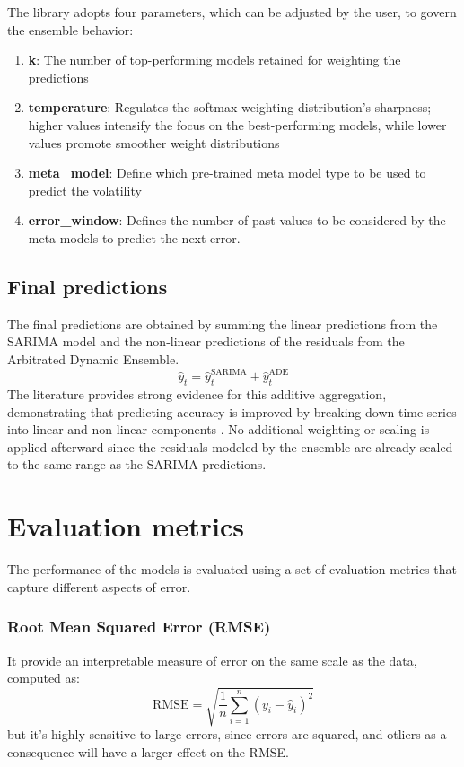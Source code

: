 The library adopts four parameters, which can be adjusted by the user, to govern the ensemble behavior:
\begin{enumerate}
    \item \textbf{k}: The number of top-performing models retained for weighting the predictions
    \item  \textbf{temperature}: Regulates the softmax weighting distribution's sharpness; higher values intensify the focus on the best-performing models, while lower values promote smoother weight distributions
    \item \textbf{meta\_model}: Define which pre-trained meta model type to be used to predict the volatility
    \item \textbf{error\_window}: Defines the number of past values to be considered by the meta-models to predict the next error.
\end{enumerate}

\subsection{Final predictions} 
The final predictions are obtained by summing the linear predictions from the SARIMA model and the non-linear predictions of the residuals from the Arbitrated Dynamic Ensemble. 
\[
\hat{y}_t = \hat{y}_t^{\text{SARIMA}} + \hat{y}_t^{\text{ADE}}
\]
The literature provides strong evidence for this additive aggregation, demonstrating that predicting accuracy is improved by breaking down time series into linear and non-linear components \cite{zhang2003hybrid}.  No additional weighting or scaling is applied afterward since the residuals modeled by the ensemble are already scaled to the same range as the SARIMA predictions. 


\section{Evaluation metrics}
The performance of the models is evaluated using a set of evaluation metrics that capture different aspects of error. 
\subsubsection{Root Mean Squared Error (RMSE)}
It provide an interpretable measure of error on the same scale as the data, computed as:
\[
\text{RMSE} = \sqrt{\frac{1}{n} \sum_{i=1}^{n} (y_i - \hat{y}_i)^2}
\]
but it's highly sensitive to large errors, since errors are squared, and otliers as a consequence will have a larger effect on the RMSE.

